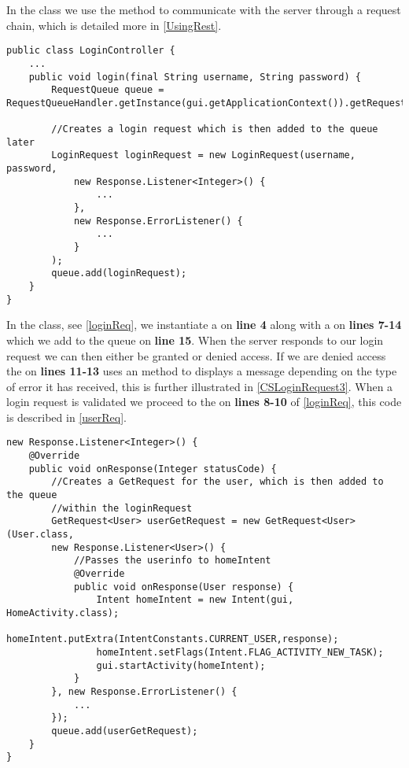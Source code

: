 In the  class we use the  method to
communicate with the server through a request chain, which is detailed more in
\autoref{UsingRest}.\nl

\begin{minipage}[H]{\linewidth}
\begin{lstlisting}[caption = Verifing the user information through a login
request, label = loginReq] 
public class LoginController {
	...
    public void login(final String username, String password) {
        RequestQueue queue = RequestQueueHandler.getInstance(gui.getApplicationContext()).getRequestQueue();

        //Creates a login request which is then added to the queue later
        LoginRequest loginRequest = new LoginRequest(username, password,
        	new Response.Listener<Integer>() {
        		...
        	},
        	new Response.ErrorListener() {
        		...
        	}
   		);
		queue.add(loginRequest);
	}
}
\end{lstlisting}
\end{minipage}

In the  class, see \autoref{loginReq}, we instantiate a
 on \textbf{line 4} along with a  on
\textbf{lines 7-14} which we add to the queue on \textbf{line 15}. When the
server responds to our login request we can then either be granted or denied
access. If we are denied access the  on
\textbf{lines 11-13} uses an  method to displays a
message depending on the type of error it has received, this is further
illustrated in \autoref{CSLoginRequest3}. When a login request is validated we
proceed to the  on \textbf{lines 8-10} of
\autoref{loginReq}, this code is described in \autoref{userReq}.\nl

\begin{minipage}[H]{\linewidth}
\begin{lstlisting}[caption = If the user information is authenticated we proceed
with a request for user, label = userReq] 
new Response.Listener<Integer>() {
	@Override
    public void onResponse(Integer statusCode) {
    	//Creates a GetRequest for the user, which is then added to the queue
    	//within the loginRequest 
    	GetRequest<User> userGetRequest = new GetRequest<User>(User.class, 
    	new Response.Listener<User>() {
        	//Passes the userinfo to homeIntent
            @Override
            public void onResponse(User response) {
            	Intent homeIntent = new Intent(gui, HomeActivity.class);
                homeIntent.putExtra(IntentConstants.CURRENT_USER,response);
                homeIntent.setFlags(Intent.FLAG_ACTIVITY_NEW_TASK);
                gui.startActivity(homeIntent);
            }
        }, new Response.ErrorListener() {
			...
        });
        queue.add(userGetRequest);
	}
}
\end{lstlisting}
\end{minipage}

